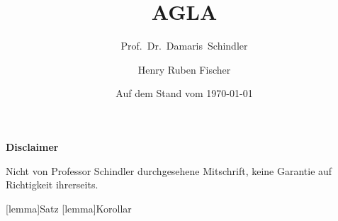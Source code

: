 \documentclass[numberindividually, numberwithin=section, empheqoverload,filemanagement]{hrflecture}
\title{AGLA \texorpdfstring{\Romannum{2}}{2}}
\subtitle{Prof.~Dr.~Damaris~Schindler}
\date{Auf dem Stand vom \today}
\author{Henry Ruben Fischer}
\begin{document}
\maketitle

\newpage
\textbf{Disclaimer}
\vspace{1cm}

Nicht von Professor Schindler durchgesehene Mitschrift, keine Garantie auf Richtigkeit ihrerseits.

\tableofcontents
\listoflectures
\listoffiles


\makeatletter
{}[lemma]{Satz}
[lemma]{Korollar}
\makeatother























\end{document}
